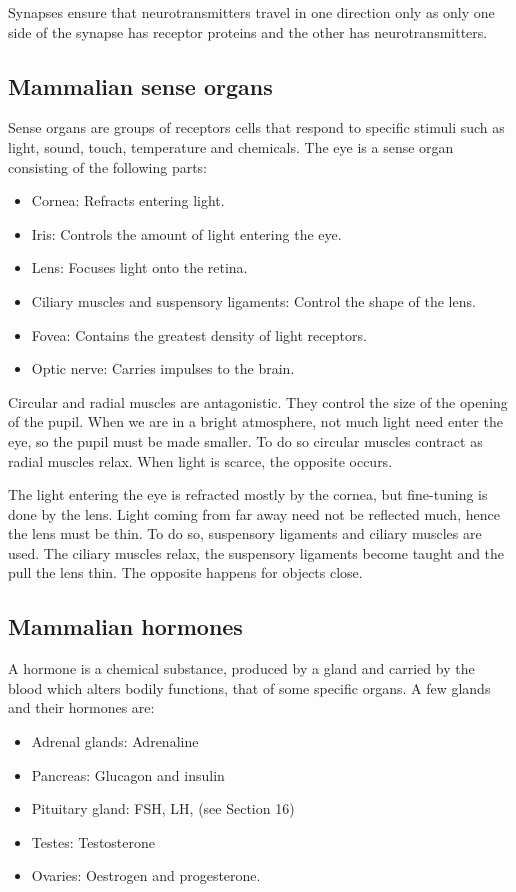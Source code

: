 Synapses ensure that neurotransmitters travel in one direction only as only one side of the synapse 
has receptor proteins and the other has neurotransmitters.

\subsection{Mammalian sense organs}
Sense organs are groups of receptors cells that respond to specific stimuli such as light, sound,
touch, temperature and chemicals. 
The eye is a sense organ consisting of the following parts:
\begin{itemize}
	\item Cornea: Refracts entering light.
	\item Iris: Controls the amount of light entering the eye.
	\item Lens: Focuses light onto the retina.
	\item Ciliary muscles and suspensory ligaments: Control the shape of the lens.
	\item Fovea: Contains the greatest density of light receptors.
	\item Optic nerve: Carries impulses to the brain.
\end{itemize}
Circular and radial muscles are antagonistic. They control the size of the opening of the pupil.
When we are in a bright atmosphere, not much light need enter the eye, so the pupil must be made
smaller. To do so circular muscles contract as radial muscles relax. When light is scarce, the 
opposite occurs.

The light entering the eye is refracted mostly by the cornea, but fine-tuning is done by the lens.
Light coming from far away need not be reflected much, hence the lens must be thin. To do so, 
suspensory ligaments and ciliary muscles are used. The ciliary muscles relax, the suspensory
ligaments become taught and the pull the lens thin. The opposite happens for objects close.

\subsection{Mammalian hormones}
A hormone is a chemical substance, produced by a gland and carried by the blood which alters 
bodily functions, that of some specific organs. A few glands and their hormones are:
\begin{itemize}
	\item Adrenal glands: Adrenaline
	\item Pancreas: Glucagon and insulin
	\item Pituitary gland: FSH, LH, (see Section 16)
	\item Testes: Testosterone
	\item Ovaries: Oestrogen and progesterone.
\end{itemize}

